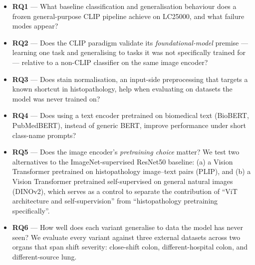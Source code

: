 \begin{itemize}
    \item \textbf{RQ1} --- What baseline classification and generalisation behaviour does a frozen general-purpose CLIP pipeline achieve on LC25000, and what failure modes appear?
    \item \textbf{RQ2} --- Does the CLIP paradigm validate its \emph{foundational-model} premise --- learning one task and generalising to tasks it was not specifically trained for --- relative to a non-CLIP classifier on the same image encoder?
    \item \textbf{RQ3} --- Does stain normalisation, an input-side preprocessing that targets a known shortcut in histopathology, help when evaluating on datasets the model was never trained on?
    \item \textbf{RQ4} --- Does using a text encoder pretrained on biomedical text (BioBERT, PubMedBERT), instead of generic BERT, improve performance under short class-name prompts?
    \item \textbf{RQ5} --- Does the image encoder's \emph{pretraining choice} matter? We test two alternatives to the ImageNet-supervised ResNet50 baseline: (a) a Vision Transformer pretrained on histopathology image--text pairs (PLIP), and (b) a Vision Transformer pretrained self-supervised on general natural images (DINOv2), which serves as a control to separate the contribution of ``ViT architecture and self-supervision'' from ``histopathology pretraining specifically''.
    \item \textbf{RQ6} --- How well does each variant generalise to data the model has never seen? We evaluate every variant against three external datasets across two organs that span shift severity: close-shift colon, different-hospital colon, and different-source lung.
\end{itemize}


